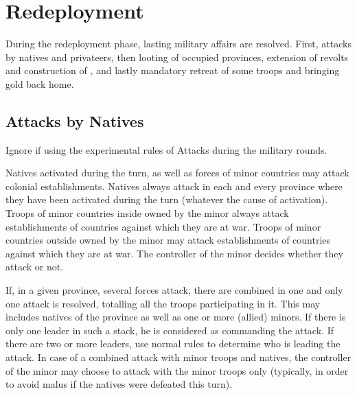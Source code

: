 \chapter{Redeployment}\label{chapter:Redep}


During the redeployment phase, lasting military affairs are resolved. First,
attacks by natives and privateers, then looting of occupied provinces,
extension of revolts and construction of \Presidios, and lastly mandatory
retreat of some troops and bringing \ROTW gold back home.

\RedepPhase

\section{Attacks by Natives}\label{chRedep:Native Attack}
\begin{designnote}
  Ignore if using the experimental rules of Attacks during the military
  rounds.
\end{designnote}

\aparag Natives activated during the turn, as well as forces of \ROTW minor
countries may attack colonial establishments.
\bparag Natives always attack in each and every province where they have been
activated during the turn (whatever the cause of activation).
\bparag Troops of \ROTW minor countries inside \Areas owned by the minor
always attack establishments of countries against which they are at war.
\bparag Troops of \ROTW minor countries outside \Areas owned by the minor may
attack establishments of countries against which they are at war. The
controller of the minor decides whether they attack or not.

\bparag If, in a given province, several forces attack, there are combined in
one and only one attack is resolved, totalling all the troops participating in
it.
\bparag This may includes natives of the province as well as one or more
(allied) \ROTW minors.
\bparag If there is only one leader in such a stack, he is considered as
commanding the attack. If there are two or more leaders, use normal rules to
determine who is leading the attack.
\bparag In case of a combined attack with minor troops and natives, the
controller of the minor may choose to attack with the minor troops only
(typically, in order to avoid malus if the natives were defeated this turn).


